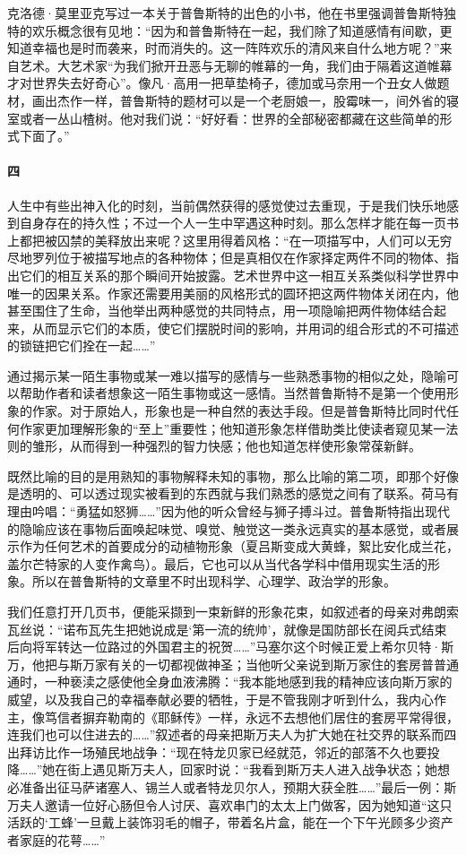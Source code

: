 \par 克洛德·莫里亚克写过一本关于普鲁斯特的出色的小书，他在书里强调普鲁斯特独特的欢乐概念很有见地：“因为和普鲁斯特在一起，我们除了知道感情有间歇，更知道幸福也是时而袭来，时而消失的。这一阵阵欢乐的清风来自什么地方呢？”来自艺术。大艺术家“为我们掀开丑恶与无聊的帷幕的一角，我们由于隔着这道帷幕才对世界失去好奇心”。像凡·高用一把草垫椅子，德加或马奈用一个丑女人做题材，画出杰作一样，普鲁斯特的题材可以是一个老厨娘一，股霉味一，间外省的寝室或者一丛山楂树。他对我们说：“好好看：世界的全部秘密都藏在这些简单的形式下面了。”
\paragraph*{四}
\par 人生中有些出神入化的时刻，当前偶然获得的感觉使过去重现，于是我们快乐地感到自身存在的持久性；不过一个人一生中罕遇这种时刻。那么怎样才能在每一页书上都把被囚禁的美释放出来呢？这里用得着风格：“在一项描写中，人们可以无穷尽地罗列位于被描写地点的各种物体；但是真相仅在作家择定两件不同的物体、指出它们的相互关系的那个瞬间开始披露。艺术世界中这一相互关系类似科学世界中唯一的因果关系。作家还需要用美丽的风格形式的圆环把这两件物体关闭在内，他甚至围住了生命，当他举出两种感觉的共同特点，用一项隐喻把两件物体结合起来，从而显示它们的本质，使它们摆脱时间的影响，并用词的组合形式的不可描述的锁链把它们拴在一起……”
\par 通过揭示某一陌生事物或某一难以描写的感情与一些熟悉事物的相似之处，隐喻可以帮助作者和读者想象这一陌生事物或这一感情。当然普鲁斯特不是第一个使用形象的作家。对于原始人，形象也是一种自然的表达手段。但是普鲁斯特比同时代任何作家更加理解形象的“至上”重要性；他知道形象怎样借助类比使读者窥见某一法则的雏形，从而得到一种强烈的智力快感；他也知道怎样使形象常葆新鲜。
\par 既然比喻的目的是用熟知的事物解释未知的事物，那么比喻的第二项，即那个好像是透明的、可以透过现实被看到的东西就与我们熟悉的感觉之间有了联系。荷马有理由吟唱：“勇猛如怒狮……”因为他的听众曾经与狮子搏斗过。普鲁斯特指出现代的隐喻应该在事物后面唤起味觉、嗅觉、触觉这一类永远真实的基本感觉，或者展示作为任何艺术的首要成分的动植物形象（夏吕斯变成大黄蜂，絮比安化成兰花，盖尔芒特家的人变作禽鸟）。最后，它也可以从当代各学科中借用现实生活的形象。所以在普鲁斯特的文章里不时出现科学、心理学、政治学的形象。
\par 我们任意打开几页书，便能采撷到一束新鲜的形象花束，如叙述者的母亲对弗朗索瓦丝说：“诺布瓦先生把她说成是‘第一流的统帅’，就像是国防部长在阅兵式结束后向将军转达一位路过的外国君主的祝贺……”马塞尔这个时候正爱上希尔贝特·斯万，他把与斯万家有关的一切都视做神圣；当他听父亲说到斯万家住的套房普普通通时，一种亵渎之感使他全身血液沸腾：“我本能地感到我的精神应该向斯万家的威望，以及我自己的幸福奉献必要的牺牲，于是不管我刚才听到什么，我内心作主，像笃信者摒弃勒南的《耶稣传》一样，永远不去想他们居住的套房平常得很，连我们也可以住进去的……”叙述者的母亲把斯万夫人为扩大她在社交界的联系而四出拜访比作一场殖民地战争：“现在特龙贝家已经就范，邻近的部落不久也要投降……”她在街上遇见斯万夫人，回家时说：“我看到斯万夫人进入战争状态；她想必准备出征马萨诸塞人、锡兰人或者特龙贝尔人，预期大获全胜……”最后一例：斯万夫人邀请一位好心肠但令人讨厌、喜欢串门的太太上门做客，因为她知道“这只活跃的‘工蜂’一旦戴上装饰羽毛的帽子，带着名片盒，能在一个下午光顾多少资产者家庭的花萼……”
